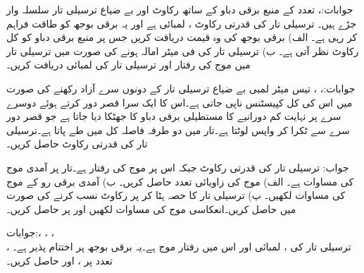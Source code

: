جوابات:، 
تعدد  کے منبع برقی دباو کے ساتھ رکاوٹ  اور بے ضیاع ترسیلی تار سلسلہ وار جڑے ہیں۔ ترسیلی تار کی قدرتی رکاوٹ ، لمبائی  ہے اور یہ برقی بوجھ  کو طاقت فراہم کر رہی ہے۔ الف) برقی بوجھ کی وہ قیمت دریافت کریں جس پر منبع برقی دباو کو کل  رکاوٹ نظر آتی ہے۔ ب) ترسیلی تار کی فی میٹر امالہ  ہونے کی صورت میں ترسیلی تار میں موج کی رفتار اور ترسیلی تار کی لمبائی دریافت کریں۔ 

جوابات:، ، 
تیس میٹر لمبی بے ضیاع ترسیلی تار کے دونوں سرے آزاد رکھنے کی صورت میں اس کی کل کپیسٹنس  ناپی جاتی ہے۔اس کا ایک سرا قصر دور کرتے ہوئے دوسرے سرے پر نہایت کم دورانیے کا مستطیلی برقی دباو کا جھٹکا دیا جاتا ہے جو قصر دور سرے سے ٹکرا کر واپس لوٹتا ہے۔تار میں دو طرفہ فاصلہ کل  میں طے پاتا ہے۔ترسیلی تار کی قدرتی رکاوٹ حاصل کریں۔

جواب:  
ترسیلی تار کی قدرتی رکاوٹ  جبکہ اس پر موج کی رفتار  ہے۔تار پر آمدی موج کی مساوات   ہے۔ الف) موج کی زاویائی تعدد حاصل کریں۔ ب) آمدی برقی رو کے موج کی مساوات لکھیں۔ پ) ترسیلی تار کا  حصہ ہٹا کر  پر  رکاوٹ نسب کرنے کی صورت میں  حاصل کریں۔انعکاسی موج  کی مساوات لکھیں اور  پر  حاصل کریں۔

جوابات:، ،
 ، \\
، 
ترسیلی تار کی ، لمبائی  اور اس میں رفتار موج  ہے۔یہ  برقی بوجھ پر اختتام پذیر ہے۔تعدد  پر  ،  اور  حاصل کریں۔

